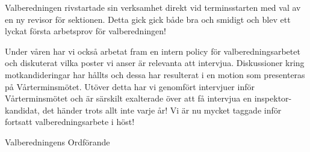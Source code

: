 \documentclass[../_main/handlingar.tex]{subfiles}
\begin{document}
Valberedningen rivstartade sin verksamhet direkt vid terminsstarten med val av en ny revisor för sektionen. Detta gick gick både bra och smidigt och blev ett lyckat första arbetsprov för valberedningen!

Under våren har vi också arbetat fram en intern policy för valberedningsarbetet och diskuterat vilka poster vi anser är relevanta att intervjua. Diskussioner kring motkandideringar har hållts och dessa har resulterat i en motion som presenteras på Vårterminsmötet. Utöver detta har vi genomfört intervjuer inför Vårterminsmötet och är särskilt exalterade över att få intervjua en inspektor-kandidat, det händer trots allt inte varje år! Vi är nu mycket taggade inför fortsatt valberedningsarbete i höst!

\begin{signatures}{1}
    \mvh
    \signature{Elin Magnusson}{Valberedningens Ordförande}
\end{signatures}
\end{document}
